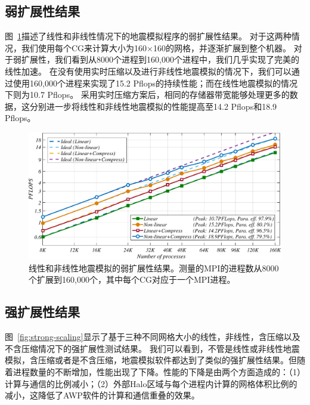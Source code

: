 \documentclass[degree=doctor]{thuthesis}
\begin{document}
\subsection{弱扩展性结果}

图~\ref {fig:weak-scaling}描述了线性和非线性情况下的地震模拟程序的弱扩展性结果。 对于这两种情况，我们使用每个CG来计算大小为160×160的网格，并逐渐扩展到整个机器。 对于弱扩展性，我们看到从8000个进程到160,000个进程中，我们几乎实现了完美的线性加速。 在没有使用实时压缩以及进行非线性地震模拟的情况下，我们可以通过使用160,000个进程来实现了15.2 Pflops的持续性能；而在线性地震模拟的情况下则为10.7 Pflops。 采用实时压缩方案后，相同的存储器带宽能够处理更多的数据，这分别进一步将线性和非线性地震模拟的性能提高至14.2 Pflops和18.9 Pflops。

\begin{figure}[ht]
\centering
\includegraphics[width=0.9\columnwidth]{weak_scaling.pdf}
\caption{线性和非线性地震模拟的弱扩展性结果。测量的MPI的进程数从8000个扩展到160,000个，其中每个CG对应于一个MPI进程。}
\label{fig:weak-scaling}
\end{figure}

\subsection{强扩展性结果}

图~\ref {fig:strong-scaling}显示了基于三种不同网格大小的线性，非线性，含压缩以及不含压缩情况下的强扩展性测试结果。 我们可以看到，不管是线性或非线性地震模拟，含压缩或者是不含压缩，地震模拟软件都达到了类似的强扩展性结果。但随着进程数量的不断增加，性能出现了下降。性能的下降是由两个方面造成的：（1）计算与通信的比例减小；（2）外部Halo区域与每个进程内计算的网格体积比例的减小，这降低了AWP软件的计算和通信重叠的效果。
\end{document}
